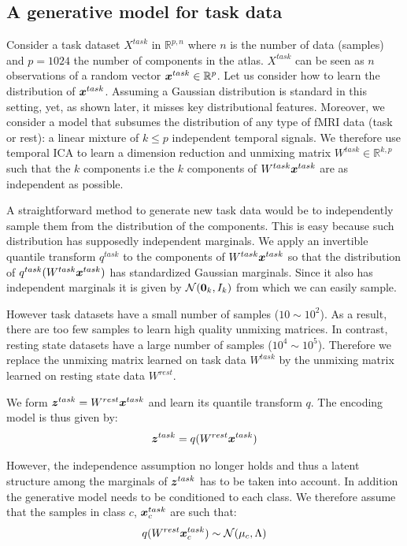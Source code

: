 \subsection{A generative model for task data}
Consider a task dataset $X^{task}$ in $\mathbb{R}^{p,n}$ where $n$ is the number of
data (samples) and $p=1024$ the number of components in the atlas. $X^{task}$ can be seen as $n$
observations of a random vector $\boldsymbol{x}^{task} \in \mathbb{R}^p$. Let us
consider how to learn the distribution of $\boldsymbol{x}^{task}$. 
%
Assuming a Gaussian distribution is standard in this setting, yet, as
shown later, it misses key distributional features.
%
Moreover, we consider a model that subsumes the distribution of any type of
fMRI data (task or rest): a linear mixture of $k \leq p$ independent temporal signals.
%
We therefore use temporal ICA to learn a dimension reduction and unmixing matrix
$W^{task} \in \mathbb{R}^{k, p}$ such that the $k$ components i.e the $k$ components of
$W^{task} \boldsymbol{x}^{task}$ are as
independent as possible.

A straightforward method to generate new task data would be to
independently sample them from the distribution of the components.
%
This is easy because such distribution has supposedly independent marginals.
We apply an invertible quantile transform $q^{task}$ to the components of $W^{task} \boldsymbol{x}^{task}$ so that
the distribution of $q^{task}(W^{task} \boldsymbol{x}^{task})$ has standardized Gaussian
marginals. Since it also has independent marginals it is given by $\mathcal{N}({\boldsymbol{0}}_k, I_k)$
from which we can easily sample.

However task datasets   have a small number of samples ($10 \sim 10^2$). As a
result, there are too few samples to learn high quality unmixing matrices. In
contrast, resting state datasets have a large number of samples ($10^4 \sim 10^5$).
Therefore we replace the unmixing matrix learned on task data $W^{task}$ by the
unmixing matrix learned on resting state data $W^{rest}$.

We form $\boldsymbol{z}^{task} = W^{rest} \boldsymbol{x}^{task}$ and learn its quantile
transform $q$.
The encoding model is thus given by:
\begin{align}
  \boldsymbol{z}^{task} = q(W^{rest} \boldsymbol{x}^{task})
\end{align}

However, the independence assumption no longer holds and thus a latent structure among the marginals of
$\boldsymbol{z}^{task}$ has to be taken into account. In addition the generative model needs
to be conditioned to each class. We therefore assume that the samples in class
$c$, $\boldsymbol{x}_c^{task}$ are such that:
\begin{align}
q(W^{rest}\boldsymbol{x}^{task}_c) \sim \mathcal{N}( \mu_c, \Lambda)
\end{align}

